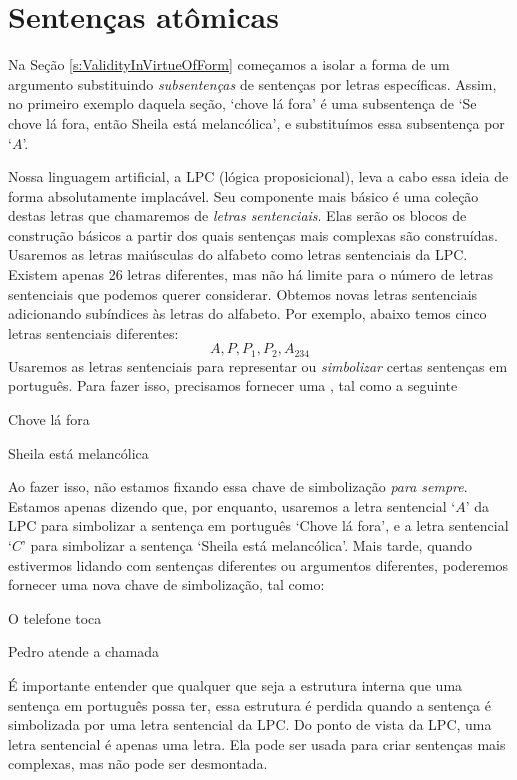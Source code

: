 \section{Sentenças atômicas}

Na Seção \ref{s:ValidityInVirtueOfForm} começamos a isolar a forma de um argumento substituindo \emph{subsentenças} de sentenças por letras específicas.
Assim, no primeiro exemplo daquela seção, `chove lá fora' é uma subsentença de `Se chove lá fora, então Sheila está melancólica', e substituímos essa subsentença por `$A$'.

Nossa linguagem artificial, a LPC (lógica proposicional), leva a cabo essa ideia de forma absolutamente implacável.
Seu componente mais básico é uma coleção destas letras que chamaremos de \emph{letras sentenciais}.
Elas serão os blocos de construção básicos a partir dos quais sentenças mais complexas são construídas.
Usaremos as letras maiúsculas do alfabeto como letras sentenciais da LPC.
Existem apenas 26 letras diferentes, mas não há limite para o número de letras sentenciais que podemos querer considerar.
Obtemos novas letras sentenciais adicionando subíndices às letras do alfabeto.
Por exemplo, abaixo temos cinco letras sentenciais diferentes:
	$$A, P, P_1, P_2, A_{234}$$
Usaremos as letras sentenciais para representar ou \emph{simbolizar} certas sentenças em português.
Para fazer isso, precisamos fornecer uma , tal como a seguinte
	\begin{ekey}
		\item[A] Chove lá fora
		\item[C] Sheila está melancólica
	\end{ekey}
Ao fazer isso, não estamos fixando essa chave de simbolização \emph{para sempre}.
Estamos apenas dizendo que, por enquanto, usaremos a letra sentencial `$A$'  da LPC para simbolizar a sentença em português `Chove lá fora', e a letra sentencial `$C$' para simbolizar a sentença `Sheila está melancólica'.
Mais tarde, quando estivermos lidando com sentenças diferentes ou argumentos diferentes, poderemos fornecer uma nova chave de simbolização, tal como:
	\begin{ekey}
		\item[A] O telefone toca
		\item[C] Pedro atende a chamada
	\end{ekey}
É importante entender que qualquer que seja a estrutura interna que uma sentença em português possa ter, essa estrutura é perdida quando a sentença é simbolizada por uma letra sentencial da LPC.
Do ponto de vista da LPC, uma letra sentencial é apenas uma letra.
Ela pode ser usada para criar sentenças mais complexas, mas não pode ser desmontada.

